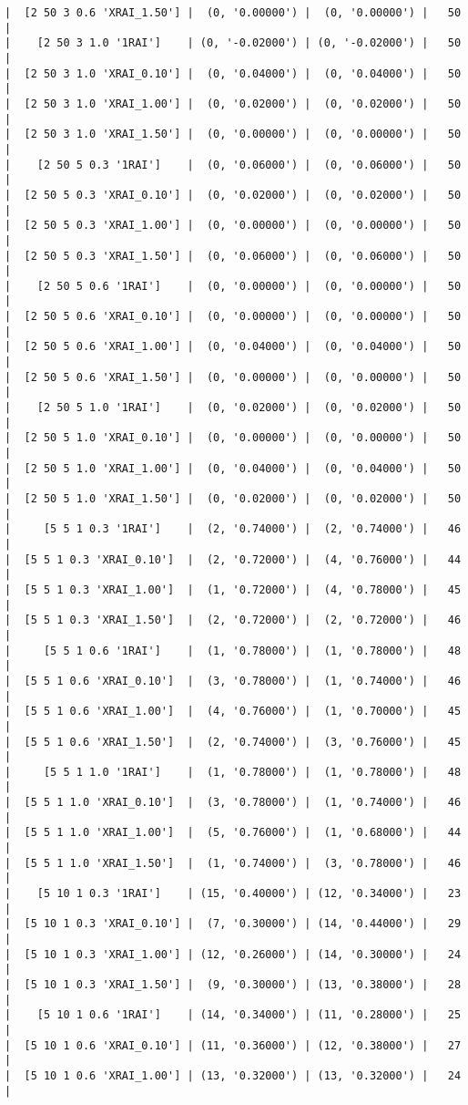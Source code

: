 \documentclass{article}
\begin{document}
\begin{verbatim}
|  [2 50 3 0.6 'XRAI_1.50'] |  (0, '0.00000') |  (0, '0.00000') |   50  |
|    [2 50 3 1.0 '1RAI']    | (0, '-0.02000') | (0, '-0.02000') |   50  |
|  [2 50 3 1.0 'XRAI_0.10'] |  (0, '0.04000') |  (0, '0.04000') |   50  |
|  [2 50 3 1.0 'XRAI_1.00'] |  (0, '0.02000') |  (0, '0.02000') |   50  |
|  [2 50 3 1.0 'XRAI_1.50'] |  (0, '0.00000') |  (0, '0.00000') |   50  |
|    [2 50 5 0.3 '1RAI']    |  (0, '0.06000') |  (0, '0.06000') |   50  |
|  [2 50 5 0.3 'XRAI_0.10'] |  (0, '0.02000') |  (0, '0.02000') |   50  |
|  [2 50 5 0.3 'XRAI_1.00'] |  (0, '0.00000') |  (0, '0.00000') |   50  |
|  [2 50 5 0.3 'XRAI_1.50'] |  (0, '0.06000') |  (0, '0.06000') |   50  |
|    [2 50 5 0.6 '1RAI']    |  (0, '0.00000') |  (0, '0.00000') |   50  |
|  [2 50 5 0.6 'XRAI_0.10'] |  (0, '0.00000') |  (0, '0.00000') |   50  |
|  [2 50 5 0.6 'XRAI_1.00'] |  (0, '0.04000') |  (0, '0.04000') |   50  |
|  [2 50 5 0.6 'XRAI_1.50'] |  (0, '0.00000') |  (0, '0.00000') |   50  |
|    [2 50 5 1.0 '1RAI']    |  (0, '0.02000') |  (0, '0.02000') |   50  |
|  [2 50 5 1.0 'XRAI_0.10'] |  (0, '0.00000') |  (0, '0.00000') |   50  |
|  [2 50 5 1.0 'XRAI_1.00'] |  (0, '0.04000') |  (0, '0.04000') |   50  |
|  [2 50 5 1.0 'XRAI_1.50'] |  (0, '0.02000') |  (0, '0.02000') |   50  |
|     [5 5 1 0.3 '1RAI']    |  (2, '0.74000') |  (2, '0.74000') |   46  |
|  [5 5 1 0.3 'XRAI_0.10']  |  (2, '0.72000') |  (4, '0.76000') |   44  |
|  [5 5 1 0.3 'XRAI_1.00']  |  (1, '0.72000') |  (4, '0.78000') |   45  |
|  [5 5 1 0.3 'XRAI_1.50']  |  (2, '0.72000') |  (2, '0.72000') |   46  |
|     [5 5 1 0.6 '1RAI']    |  (1, '0.78000') |  (1, '0.78000') |   48  |
|  [5 5 1 0.6 'XRAI_0.10']  |  (3, '0.78000') |  (1, '0.74000') |   46  |
|  [5 5 1 0.6 'XRAI_1.00']  |  (4, '0.76000') |  (1, '0.70000') |   45  |
|  [5 5 1 0.6 'XRAI_1.50']  |  (2, '0.74000') |  (3, '0.76000') |   45  |
|     [5 5 1 1.0 '1RAI']    |  (1, '0.78000') |  (1, '0.78000') |   48  |
|  [5 5 1 1.0 'XRAI_0.10']  |  (3, '0.78000') |  (1, '0.74000') |   46  |
|  [5 5 1 1.0 'XRAI_1.00']  |  (5, '0.76000') |  (1, '0.68000') |   44  |
|  [5 5 1 1.0 'XRAI_1.50']  |  (1, '0.74000') |  (3, '0.78000') |   46  |
|    [5 10 1 0.3 '1RAI']    | (15, '0.40000') | (12, '0.34000') |   23  |
|  [5 10 1 0.3 'XRAI_0.10'] |  (7, '0.30000') | (14, '0.44000') |   29  |
|  [5 10 1 0.3 'XRAI_1.00'] | (12, '0.26000') | (14, '0.30000') |   24  |
|  [5 10 1 0.3 'XRAI_1.50'] |  (9, '0.30000') | (13, '0.38000') |   28  |
|    [5 10 1 0.6 '1RAI']    | (14, '0.34000') | (11, '0.28000') |   25  |
|  [5 10 1 0.6 'XRAI_0.10'] | (11, '0.36000') | (12, '0.38000') |   27  |
|  [5 10 1 0.6 'XRAI_1.00'] | (13, '0.32000') | (13, '0.32000') |   24  |

\end{verbatim}
\end{document}
